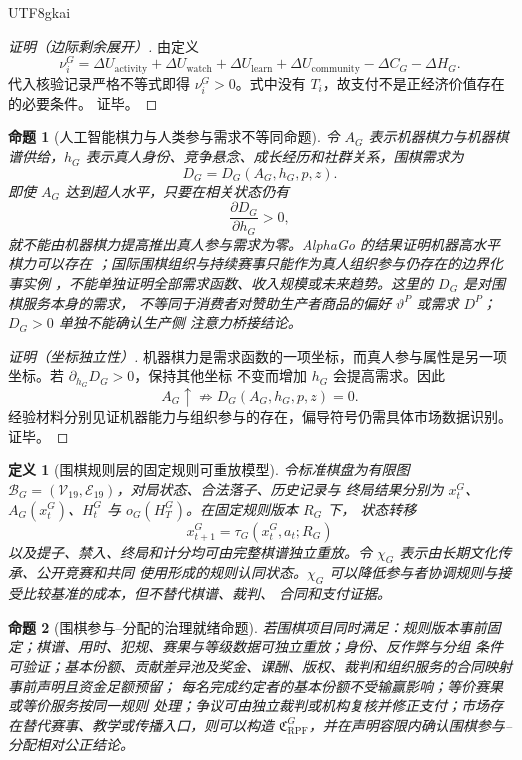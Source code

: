 \documentclass[12pt,a4paper,openany]{report}
\newtheorem{definition}{定义}[chapter]
\newtheorem{proposition}{命题}[chapter]
\begin{document}
\begin{CJK*}{UTF8}{gkai}
\begin{proof}[证明（边际剩余展开）]
由定义
\[
  \nu_i^G
  =\Delta U_{\mathrm{activity}}+\Delta U_{\mathrm{watch}}
  +\Delta U_{\mathrm{learn}}+\Delta U_{\mathrm{community}}
  -\Delta C_G-\Delta H_G.
\]
代入核验记录严格不等式即得 \(\nu_i^G>0\)。式中没有 \(T_i\)，故支付不是正经济价值存在的必要条件。
证毕。
\end{proof}

\begin{proposition}[人工智能棋力与人类参与需求不等同命题]
\label{prop:ai-go-human-participation}
令 \(A_G\) 表示机器棋力与机器棋谱供给，\(h_G\) 表示真人身份、竞争悬念、成长经历和社群关系，围棋需求为
\[
  D_G=D_G(A_G,h_G,p,z).
\]
即使 \(A_G\) 达到超人水平，只要在相关状态仍有
\[
  \frac{\partial D_G}{\partial h_G}>0,
\]
就不能由机器棋力提高推出真人参与需求为零。AlphaGo 的结果证明机器高水平棋力可以存在
\cite{Silver2016AlphaGo}；国际围棋组织与持续赛事只能作为真人组织参与仍存在的边界化事实例
\cite{IGF2026}，不能单独证明全部需求函数、收入规模或未来趋势。这里的 \(D_G\) 是对围棋服务本身的需求，
不等同于消费者对赞助生产者商品的偏好 \(\vartheta^P\) 或需求 \(D^P\)；\(D_G>0\) 单独不能确认生产侧
注意力桥接结论。
\end{proposition}

\begin{proof}[证明（坐标独立性）]
机器棋力是需求函数的一项坐标，而真人参与属性是另一项坐标。若 \(\partial_{h_G}D_G>0\)，保持其他坐标
不变而增加 \(h_G\) 会提高需求。因此
\[
  A_G\uparrow
  \not\Longrightarrow
  D_G(A_G,h_G,p,z)=0.
\]
经验材料分别见证机器能力与组织参与的存在，偏导符号仍需具体市场数据识别。证毕。
\end{proof}

\begin{definition}[围棋规则层的固定规则可重放模型]
令标准棋盘为有限图 \(\mathcal B_G=(\mathcal V_{19},\mathcal E_{19})\)，对局状态、合法落子、历史记录与
终局结果分别为 \(x_t^G\)、\(A_G(x_t^G)\)、\(H_t^G\) 与 \(o_G(H_T^G)\)。在固定规则版本 \(R_G\) 下，
状态转移
\[
  x_{t+1}^G=\tau_G(x_t^G,a_t;R_G)
\]
以及提子、禁入、终局和计分均可由完整棋谱独立重放。令 \(\chi_G\) 表示由长期文化传承、公开竞赛和共同
使用形成的规则认同状态。\(\chi_G\) 可以降低参与者协调规则与接受比较基准的成本，但不替代棋谱、裁判、
合同和支付证据。
\end{definition}

\begin{proposition}[围棋参与--分配的治理就绪命题]
\label{prop:go-governance-readiness}
若围棋项目同时满足：规则版本事前固定；棋谱、用时、犯规、赛果与等级数据可独立重放；身份、反作弊与分组
条件可验证；基本份额、贡献差异池及奖金、课酬、版权、裁判和组织服务的合同映射事前声明且资金足额预留；
每名完成约定者的基本份额不受输赢影响；等价赛果或等价服务按同一规则
处理；争议可由独立裁判或机构复核并修正支付；市场存在替代赛事、教学或传播入口，则可以构造
\(\mathfrak C_{\mathrm{RPF}}^G\)，并在声明容限内确认围棋参与--分配相对公正结论。


\end{proposition}
\end{CJK*}
\end{document}

